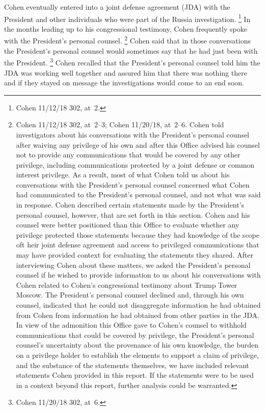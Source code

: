 Cohen eventually entered into a joint defense agreement (JDA) with the President and other individuals who were part of the Russia investigation.%
\footnote{Cohen 11/12/18 302, at~2.}
In the months leading up to his congressional testimony, Cohen frequently spoke with the President's personal counsel.%
\footnote{Cohen 11/12/18 302, at~2--3;
Cohen 11/20/18, at~2--6.
Cohen told investigators about his conversations with the President's personal counsel after waiving any privilege of his own and after this Office advised his counsel not to provide any communications that would be covered by any other privilege, including communications protected by a joint defense or common interest privilege.
As a result, most of what Cohen told us about his conversations with the President's personal counsel concerned what Cohen had communicated to the President's personal counsel, and not what was said in response.
Cohen described certain statements made by the President's personal counsel, however, that are set forth in this section.
Cohen and his counsel were better positioned than this Office to evaluate whether any privilege protected those statements because they had knowledge of the scope oft heir joint defense agreement and access to privileged communications that may have provided context for evaluating the statements they shared.
After interviewing Cohen about these matters, we asked the President's personal counsel if he wished to provide information to us about his conversations with Cohen related to Cohen's congressional testimony about Trump Tower Moscow.
The President's personal counsel declined and, through his own counsel, indicated that he could not disaggregate information he had obtained from Cohen from information he had obtained from other parties in the JDA\null.
In view of the admonition this Office gave to Cohen's counsel to withhold communications that could be covered by privilege, the President's personal counsel's uncertainty about the provenance of his own knowledge, the burden on a privilege holder to establish the elements to support a claim of privilege, and the substance of the statements themselves, we have included relevant statements Cohen provided in this report.
If the statements were to be used in a context beyond this report, further analysis could be warranted.}
Cohen said that in those conversations the President's personal counsel would sometimes say that he had just been with the President.%
\footnote{Cohen 11/20/18 302, at~6.}
Cohen recalled that the President's personal counsel told him the JDA was working well together and assured him that there was nothing there and if they stayed on message the investigations would come to an end soon.%
